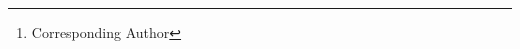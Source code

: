 \author{
    Rui Wang\textsuperscript{\rm 1}~
    Yimu Sun\textsuperscript{\rm 1}~
    Jingxing Guo\textsuperscript{\rm 1}~
    Huisi Wu\textsuperscript{\rm 1}\thanks{Corresponding Author}~
    Jing Qin\textsuperscript{\rm 2}
\\
    \small{\textsuperscript{\rm 1}College of Computer Science and Software Engineering, Shenzhen University}\\
    \small{\textsuperscript{\rm 2}Centre for Smart Health, School of Nursing, The Hong Kong Polytechnic University}\\
    {\tt\scriptsize 2400101058@mails.szu.edu.cn, hswu@szu.edu.cn}
}